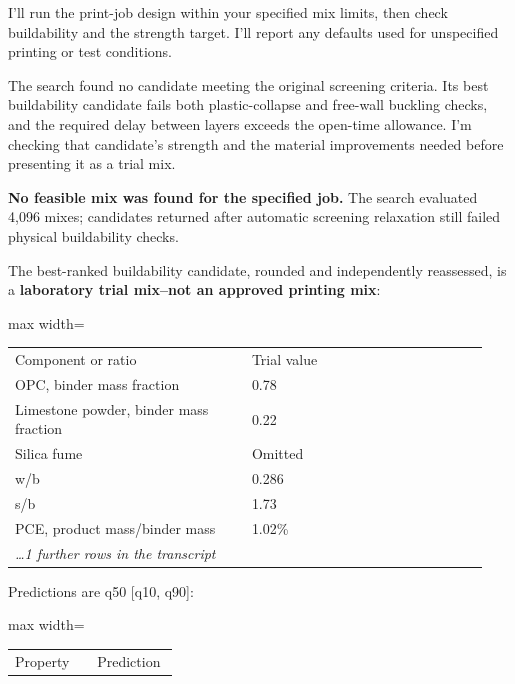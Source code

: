 \begin{agentbox}
I'll run the print-job design within your specified mix limits, then check buildability and the strength target. I'll report any defaults used for unspecified printing or test conditions.\par
The search found no candidate meeting the original screening criteria. Its best buildability candidate fails both plastic-collapse and free-wall buckling checks, and the required delay between layers exceeds the open-time allowance. I'm checking that candidate's strength and the material improvements needed before presenting it as a trial mix.\par
\textbf{No feasible mix was found for the specified job.} The search evaluated 4,096 mixes; candidates returned after automatic screening relaxation still failed physical buildability checks.\par
\par
The best-ranked buildability candidate, rounded and independently reassessed, is a \textbf{laboratory trial mix--not an approved printing mix}:\par
\par
\par\smallskip\begin{adjustbox}{max width=\linewidth}\begin{tabular}{p{0.47\linewidth}p{0.47\linewidth}}
Component or ratio & Trial value \\
OPC, binder mass fraction & 0.78 \\
Limestone powder, binder mass fraction & 0.22 \\
Silica fume & Omitted \\
w/b & 0.286 \\
s/b & 1.73 \\
PCE, product mass/binder mass & 1.02\% \\
\multicolumn{1}{l}{\textit{\ldots 1 further rows in the transcript}} \\
\end{tabular}\end{adjustbox}\par\smallskip
\par
Predictions are q50 [q10, q90]:\par
\par
\par\smallskip\begin{adjustbox}{max width=\linewidth}\begin{tabular}{p{0.47\linewidth}p{0.47\linewidth}}
Property & Prediction \\

\end{tabular}
\end{adjustbox}
\end{agentbox}
